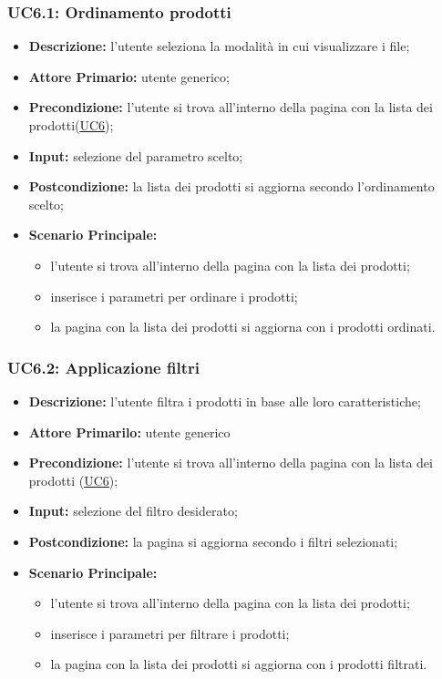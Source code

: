         \subsubsection{UC6.1: Ordinamento prodotti}
        \label{sec:UC6.1}
        \begin{itemize}
            \item \textbf{Descrizione:} l'utente seleziona la modalità in cui visualizzare i file;
            \item \textbf{Attore Primario:} utente generico;
            \item \textbf{Precondizione:} l'utente si trova all'interno della pagina con la lista dei prodotti(\hyperref[sec:UC6]{\underline{UC6}});
            \item \textbf{Input:} selezione del parametro scelto;
            \item \textbf{Postcondizione:} la lista dei prodotti si aggiorna secondo l'ordinamento scelto;
            \item \textbf{Scenario Principale:}
            \begin{itemize}
                \item l'utente si trova all'interno della pagina con la lista dei prodotti;
                \item inserisce i parametri per ordinare i prodotti;
                \item la pagina con la lista dei prodotti si aggiorna con i prodotti ordinati.
            \end{itemize}
        \end{itemize}
        \subsubsection{UC6.2: Applicazione filtri}
        \label{sec:UC6.2}
        \begin{itemize}
            \item \textbf{Descrizione:} l'utente filtra i prodotti in base alle loro caratteristiche;
            \item \textbf{Attore Primarilo:} utente generico
            \item \textbf{Precondizione:} l'utente si trova all'interno della pagina con la lista dei prodotti (\hyperref[sec:UC6]{\underline{UC6}});
            \item \textbf{Input:} selezione del filtro desiderato;
            \item \textbf{Postcondizione:} la pagina si aggiorna secondo i filtri selezionati;
            \item \textbf{Scenario Principale:}
            \begin{itemize}
                \item l'utente si trova all'interno della pagina con la lista dei prodotti;
                \item inserisce i parametri per filtrare i prodotti;
                \item la pagina con la lista dei prodotti si aggiorna con i prodotti filtrati.
            \end{itemize}
        \end{itemize}
